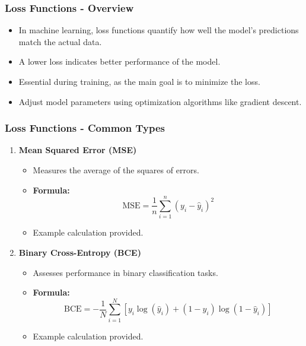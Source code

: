 \documentclass[aspectratio=169]{beamer}
\begin{document}
\begin{frame}[fragile]
    \frametitle{Loss Functions - Overview}
    \begin{itemize}
        \item In machine learning, loss functions quantify how well the model's predictions match the actual data.
        \item A lower loss indicates better performance of the model.
        \item Essential during training, as the main goal is to minimize the loss.
        \item Adjust model parameters using optimization algorithms like gradient descent.
    \end{itemize}
\end{frame}

\begin{frame}[fragile]
    \frametitle{Loss Functions - Common Types}
    \begin{enumerate}
        \item \textbf{Mean Squared Error (MSE)}
            \begin{itemize}
                \item Measures the average of the squares of errors.
                \item \textbf{Formula:} 
                \begin{equation}
                    \text{MSE} = \frac{1}{n} \sum_{i=1}^{n} (y_i - \hat{y}_i)^2
                \end{equation}
                \item Example calculation provided.
            \end{itemize}
        
        \item \textbf{Binary Cross-Entropy (BCE)}
            \begin{itemize}
                \item Assesses performance in binary classification tasks.
                \item \textbf{Formula:} 
                \begin{equation}
                    \text{BCE} = -\frac{1}{N} \sum_{i=1}^{N} [y_i \log(\hat{y}_i) + (1 - y_i) \log(1 - \hat{y}_i)]
                \end{equation}
                \item Example calculation provided.
            \end{itemize}
    \end{enumerate}
\end{frame}
\end{document}
